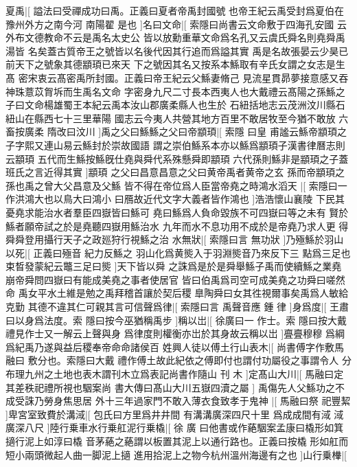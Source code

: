 夏禹|[%
謚法曰受禪成功曰禹。正義曰夏者帝禹封國號%
也帝王紀云禹受封爲夏伯在豫州外方之南今河%
%
南陽翟%
是也%
]名曰文命|[%
索隱曰尚書云文命敷于四海孔安國%
云外布文德教命不云是禹名太史公%
%
皆以放勳重華文命爲名孔又云虞氏舜名則堯舜禹湯皆%
名矣蓋古質帝王之號皆以名後代因其行追而爲謚其實%
%
禹是名故張晏云少昊已前天下之號象其德顓頊已來天%
下之號因其名又按系本鯀取有辛氏女謂之女志是生髙%
%
密宋衷云髙密禹所封國。正義曰帝王紀云父鯀妻脩己%
見流星貫昴夢接意感又吞神珠薏苡胷坼而生禹名文命%
%
字密身九尺二寸長本西夷人也大戴禮云髙陽之孫鯀之%
子曰文命楊雄蜀王本紀云禹本汝山郡廣柔縣人也生於%
%
石紐括地志云茂洲汶川縣石紐山在縣西七十三里華陽%
國志云今夷人共營其地方百里不敢居牧至今猶不敢放%
%
六畜按廣柔%
隋改曰汶川%
]禹之父曰鯀鯀之父曰帝顓頊|[%
索隱%
曰皇%
%
甫謐云鯀帝顓頊之子字熙又連山易云鯀封於崇故國語%
謂之崇伯鯀系本亦以鯀爲顓頊子漢書律曆志則云顓頊%
%
五代而生鯀按鯀旣仕堯與舜代系殊懸舜即顓頊%
六代孫則鯀非是顓頊之子蓋班氏之言近得其實%
]顓頊%
之父曰昌意昌意之父曰黄帝禹者黄帝之玄%
孫而帝顓頊之孫也禹之曾大父昌意及父鯀%
皆不得在帝位爲人臣當帝堯之時鴻水滔天%
|[%
索隱曰一作洪鴻大也以鳥大曰鴻小%
曰鴈故近代文字大義者皆作鴻也%
]浩浩懷山襄陵%
下民其憂堯求能治水者羣臣四嶽皆曰鯀可%
堯曰鯀爲人負命毀族不可四嶽曰等之未有%
賢於鯀者願帝試之於是堯聽四嶽用鯀治水%
九年而水不息功用不成於是帝堯乃求人更%
得舜舜登用攝行天子之政廵狩行視鯀之治%
水無狀|[%
索隱曰言%
無功狀%
]乃殛鯀於羽山以死|[%
正義曰殛音%
紀力反鯀之%
%
羽山化爲黄熋入于羽淵熋音乃來反下三%
點爲三足也束晳發蒙紀云鼈三足曰熋%
]天下皆以舜%
之誅爲是於是舜舉鯀子禹而使續鯀之業堯%
崩帝舜問四嶽曰有能成美堯之事者使居官%
皆曰伯禹爲司空可成美堯之功舜曰嗟然命%
禹女平水土維是勉之禹拜稽首讓於契后稷%
臯陶舜曰女其徃視爾事矣禹爲人敏給克勤%
其德不違其仁可親其言可信聲爲律|[%
索隱曰言%
禹聲音應%
%
鍾%
律%
]身爲度|[%
王肅曰以身爲法度。索%
隱曰按今巫猶稱禹步%
]稱以岀|[%
徐廣曰一%
作士。索%
%
隱曰按大戴禮見作士又一解云上聲與身%
爲律度則權衡亦岀於其身故云稱以岀%
]亹亹穆穆%
爲綱爲紀禹乃遂與益后稷奉帝命命諸侯百%
姓興人徒以傅土行山表木|[%
尚書傅字作敷馬融曰%
敷分也。索隱曰大戴%
%
禮作傅土故此紀依之傅即付也謂付功屬役之事謂令人%
分布理九州之土地也表木謂刊木立爲表記尚書作隨山%
%
刊%
木%
]定髙山大川|[%
馬融曰定其差秩祀禮所視也駰案尚%
書大傳曰髙山大川五嶽四瀆之屬%
]%
禹傷先人父鯀功之不成受誅乃勞身焦思居%
外十三年過家門不敢入薄衣食致孝于鬼神%
|[%
馬融曰祭%
祀豐絜%
]卑宮室致費於溝淢|[%
包氏曰方里爲井井間%
有溝溝廣深四尺十里%
%
爲成成間有淢%
淢廣深八尺%
]陸行乗車水行乗舡泥行乗橇|[%
徐%
廣%
%
曰他書或作蕝駰案孟康曰橇形如箕擿行泥上如淳曰橇%
音茅蕝之蕝謂以板置其泥上以通行路也。正義曰按橇%
%
形如舡而短小兩頭微起人曲一脚泥上擿%
進用拾泥上之物今杭州溫州海邊有之也%
]山行乗檋|[%
